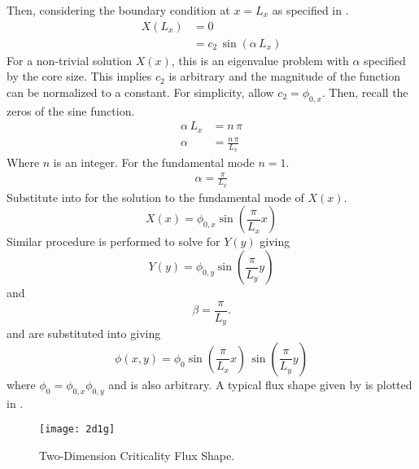   Then, considering the boundary condition at $x=L_x$ as specified in
  .
  \begin{align}
    X(L_x) &= 0 \\
    &= c_2 \, \sin(\alpha \, L_x)
  \end{align}
  For a non-trivial solution $X(x)$, this is an eigenvalue problem with $\alpha$
  specified by the core size. This implies $c_2$ is arbitrary and the
  magnitude of the function can be normalized to a constant. For simplicity,
  allow $c_2 = \phi_{0,x}$. Then, recall the zeros of the sine function.
  \begin{align}
    \alpha \, L_x &= n \, \pi \\
    \alpha &= \frac{n \, \pi}{L_x}
  \end{align}
  Where $n$ is an integer. For the fundamental mode $n=1$.
  \begin{align}
    \label{eq:2d1g_x_alpha}
    \alpha = \frac{\pi}{L_x}
  \end{align}
  Substitute  into  for the solution
  to the fundamental mode of $X(x)$.
  \begin{equation}
    \label{eq:2d1g_x_solution}
    X(x) = \phi_{0,x} \sin\left(\frac{\pi}{L_x} x \right)
  \end{equation}
  Similar procedure is performed to solve for $Y(y)$ giving
  \begin{equation}
    \label{eq:2d1g_y_solution}
    Y(y) = \phi_{0,y} \sin\left(\frac{\pi}{L_y} y \right)
  \end{equation}
  and 
  \begin{equation}
    \label{eq:2d1g_y_beta}
    \beta = \frac{\pi}{L_y}.
  \end{equation}
   and  are substituted into
   giving
  \begin{equation}
    \label{eq:analytic_2d1g}
    \phi(x,y) = \phi_0 \sin\left(\frac{\pi}{L_x} x\right) \, 
      \sin\left(\frac{\pi}{L_y} y\right)
  \end{equation}
  where $\phi_0 = \phi_{0,x} \phi_{0,y}$ and is also arbitrary.
  A typical flux shape given by  is plotted
  in .

  \begin{figure}
    \centering
    \texttt{[image: 2d1g]}
    \caption{Two-Dimension Criticality Flux Shape.}
    \label{fig:2d1g}
  \end{figure}

